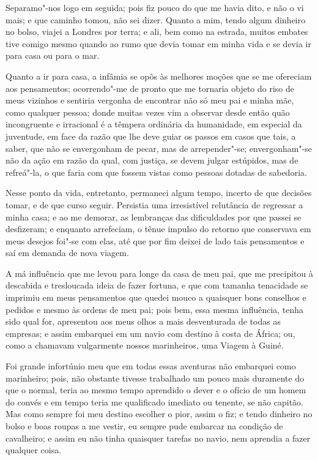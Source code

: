 Separamo"-nos logo em seguida; pois fiz pouco do que me havia dito, e não
o vi mais; e que caminho tomou, não sei dizer. Quanto a mim, tendo algum
dinheiro no bolso, viajei a Londres por terra; e ali, bem como na
estrada, muitos embates tive comigo mesmo quando ao rumo que devia tomar
em minha vida e se devia ir para casa ou para o mar.

Quanto a ir para casa, a infâmia se opôs às melhores moções que se me
ofereciam aos pensamentos; ocorrendo"-me de pronto que me tornaria objeto
do riso de meus vizinhos e sentiria vergonha de encontrar não só meu pai
e minha mãe, como qualquer pessoa; donde muitas vezes vim a observar
desde então quão incongruente e irracional é a têmpera ordinária da
humanidade, em especial da juventude, em face da razão que lhe deve
guiar os passos em casos que tais, a saber, que não se envergonham de
pecar, mas de arrepender"-se; envergonham"-se não da ação em razão da
qual, com justiça, se devem julgar estúpidos, mas de refreá"-la, o que
faria com que fossem vistas como pessoas dotadas de sabedoria.

Nesse ponto da vida, entretanto, permaneci algum tempo, incerto de que
decisões tomar, e de que curso seguir. Persistia uma irresistível
relutância de regressar a minha casa; e ao me demorar, as lembranças das
dificuldades por que passei se desfizeram; e enquanto arrefeciam, o
tênue impulso do retorno que conservava em meus desejos foi"-se com elas,
até que por fim deixei de lado tais pensamentos e saí em demanda de nova
viagem.

A má influência que me levou para longe da casa de meu pai, que me
precipitou à descabida e tresloucada ideia de fazer fortuna, e que com
tamanha tenacidade se imprimiu em meus pensamentos que quedei mouco a
quaisquer bons conselhos e pedidos e mesmo às ordens de meu pai; pois
bem, essa mesma influência, tenha sido qual for, apresentou aos meus
olhos a mais desventurada de todas as empresas; e assim embarquei em um
navio com destino à costa de África; ou, como a chamavam vulgarmente
nossos marinheiros, uma Viagem à Guiné.

Foi grande infortúnio meu que em todas essas aventuras não embarquei
como marinheiro; pois, não obstante tivesse trabalhado um pouco mais
duramente do que o normal, teria ao mesmo tempo aprendido o dever e o
ofício de um homem do convés e em tempo teria me qualificado imediato ou
tenente, se não capitão. Mas como sempre foi meu destino escolher o
pior, assim o fiz; e tendo dinheiro no bolso e boas roupas a me vestir,
eu sempre pude embarcar na condição de cavalheiro; e assim eu não tinha
quaisquer tarefas no navio, nem aprendia a fazer qualquer coisa.

